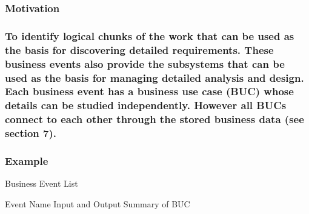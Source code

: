 \documentclass[
]{article}
\begin{document}
\hypertarget{motivation-24}{%
\subsubsection{Motivation}\label{motivation-24}}

\hypertarget{to-identify-logical-chunks-of-the-work-that-can-be-used-as-the-basis-for-discovering-detailed-requirements.-these-business-events-also-provide-the-subsystems-that-can-be-used-as-the-basis-for-managing-detailed-analysis-and-design.-each-business-event-has-a-business-use-case-buc-whose-details-can-be-studied-independently.-however-all-bucs-connect-to-each-other-through-the-stored-business-data-see-section-7.}{%
\subsubsection{\texorpdfstring{To identify logical chunks of the work
that can be used as the basis for discovering detailed requirements.
These business events also provide the subsystems that can be used as
the basis for managing detailed analysis and design. Each business event
has a business use case (BUC) whose details can be studied
independently. However all BUCs connect to each other through the stored
business data (see section 7).\\
}{To identify logical chunks of the work that can be used as the basis for discovering detailed requirements. These business events also provide the subsystems that can be used as the basis for managing detailed analysis and design. Each business event has a business use case (BUC) whose details can be studied independently. However all BUCs connect to each other through the stored business data (see section 7). }}\label{to-identify-logical-chunks-of-the-work-that-can-be-used-as-the-basis-for-discovering-detailed-requirements.-these-business-events-also-provide-the-subsystems-that-can-be-used-as-the-basis-for-managing-detailed-analysis-and-design.-each-business-event-has-a-business-use-case-buc-whose-details-can-be-studied-independently.-however-all-bucs-connect-to-each-other-through-the-stored-business-data-see-section-7.}}

\hypertarget{example}{%
\subsubsection{Example}\label{example}}

Business Event List

Event Name Input and Output Summary of BUC
\end{document}
